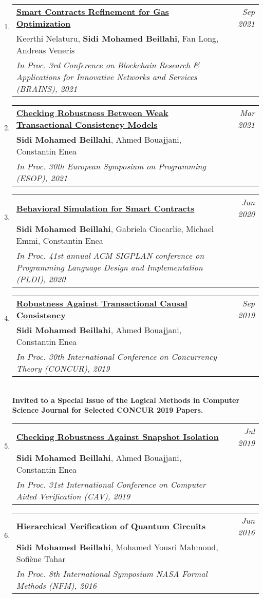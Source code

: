 \documentclass[10pt]{article}
\makeatletter
\newcommand{\lbar}[1]{{\color{#1}\ding{118}}\hspace*{2pt}}
\newenvironment{benumerate}[2]{
    \let\oldItem\item
    \def\item{\addtocounter{enumi}{-2}\oldItem}
    \begin{enumerate}[#2] \itemsep3pt
    \setcounter{enumi}{#1}
    \addtocounter{enumi}{1}}
  {\end{enumerate}}
\newenvironment{publication}[5]
{ \item
  \begin{tabular*}{7.5in}{p{6.3in}@{\extracolsep{\fill}}r}
    \href{#1}{\textbf{#2}} & \textit{#3}\\ #4 &\\ \textit{#5}&\\
  \end{tabular*}
} {}
\newenvironment{region}[3]{%
  \vspace*{0.5ex}
  {\scalebox{1.4}{\textbf{#1}}}
  \begin{benumerate}{#3}{\color{RoyalBlue}#2}}
  {\end{benumerate}\vspace{0.8ex}}
\makeatother
\begin{document}
\begin{region} {\lbar{black}Conference Publications}{{C}1}{18}
  \begin{publication} {https://beillahi.github.io/papers/BRAINS21.pdf}
		{Smart Contracts Refinement for Gas Optimization}
		{Sep 2021} {Keerthi Nelaturu, \textbf{Sidi Mohamed Beillahi}, Fan Long, Andreas Veneris}
		{In Proc. 3rd Conference on Blockchain Research \& Applications for Innovative Networks and Services (BRAINS), 2021}
  \end{publication}

  \begin{publication} {https://beillahi.github.io/papers/ESOP21.pdf}
		{Checking Robustness Between Weak Transactional Consistency Models}
		{Mar 2021} {\textbf{Sidi Mohamed Beillahi}, Ahmed Bouajjani, Constantin Enea} 
		{In Proc. 30th European Symposium on Programming (ESOP), 2021} 
  \end{publication}

	\begin{publication} {https://beillahi.github.io/papers/PLDI20.pdf}
		{Behavioral Simulation for Smart Contracts}
		{Jun 2020} {\textbf{Sidi Mohamed Beillahi}, Gabriela Ciocarlie, Michael Emmi, Constantin Enea}
		{In Proc. 41st annual ACM SIGPLAN conference on Programming Language Design and Implementation (PLDI), 2020}
  \end{publication}

	\begin{publication} {https://beillahi.github.io/papers/CONCUR19.pdf}
		{Robustness Against Transactional Causal Consistency}
		{Sep 2019} {\textbf{Sidi Mohamed Beillahi}, Ahmed Bouajjani, Constantin Enea}
    {In Proc. 30th International Conference on Concurrency Theory (CONCUR), 2019}
    {\\ \textbf{Invited to a Special Issue of the Logical Methods in Computer Science Journal for Selected CONCUR 2019 Papers.}}
  \end{publication}

  \begin{publication} {https://beillahi.github.io/papers/CAV19.pdf}
    {Checking Robustness Against Snapshot Isolation}
    {Jul 2019} {\textbf{Sidi Mohamed Beillahi}, Ahmed Bouajjani, Constantin Enea}
    {In Proc. 31st International Conference on Computer Aided Verification (CAV), 2019}
  \end{publication}

  \begin{publication} {https://beillahi.github.io/papers/NFM16.pdf}
    {Hierarchical Verification of Quantum Circuits}
    {Jun 2016} {\textbf{Sidi Mohamed Beillahi}, Mohamed Yousri Mahmoud, Sofi\`{e}ne Tahar}
    {In Proc. 8th International Symposium NASA Formal Methods (NFM), 2016}
  \end{publication}


\end{region}
\end{document}
